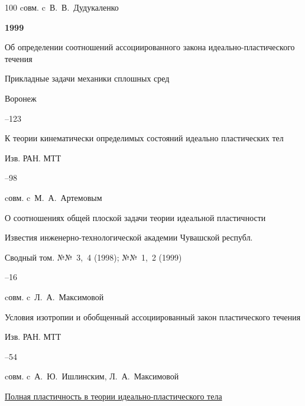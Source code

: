 \begin{thebibliography}{100}
\miscnote cовм. c~В.~В.~Дудукаленко



\item[] \centerline{\bf 1999}




\paper Об определении соотношений ассоциированного закона идеально-пластического течения 

\inbook Прикладные задачи механики сплошных сред

\publaddr Воронеж


–123




\paper К теории кинематически определимых состояний идеально пластических тел 

\jour Изв. РАН. МТТ



–98 

\miscnote cовм. c~М.~А.~Артемовым




\paper О соотношениях общей плоской задачи теории идеальной пластичности 

\jour Известия инженерно-технологической академии Чувашской республ. 

\volinfo Сводный том. №№~3,~4 (1998); №№~1,~2 (1999)

–16 

\miscnote cовм. c~Л.~А.~Максимовой




\paper Условия изотропии и обобщенный ассоциированный закон пластического течения 

\jour Изв. РАН. МТТ



–54 

\miscnote cовм. c~А.~Ю.~Ишлинским, Л.~А.~Максимовой







\paper \href{http://mi.mathnet.ru/dan2956}{Полная пластичность в теории идеально-пластического тела}


\end{thebibliography}
